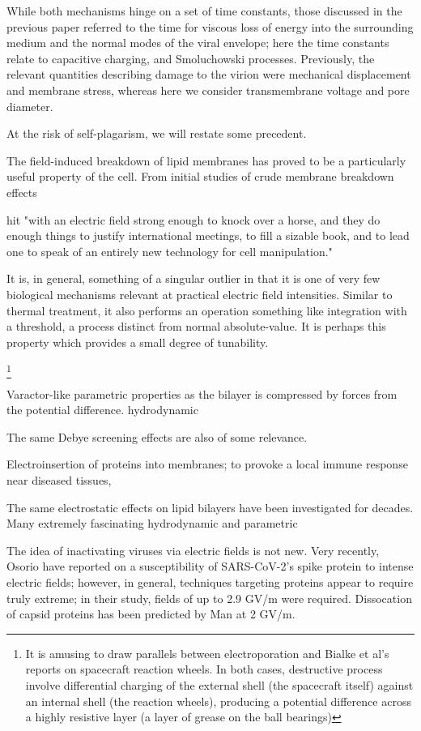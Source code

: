 \documentclass[fleqn,10pt]{paper}
\begin{document}
While both mechanisms hinge on a set of time constants, those discussed in the previous paper referred to the time for viscous loss of energy into the surrounding medium and the normal modes of the viral envelope; here the time constants relate to capacitive charging, and Smoluchowski processes. Previously, the relevant quantities describing damage to the virion were mechanical displacement and membrane stress, whereas here we consider transmembrane voltage and pore diameter. 

At the risk of self-plagarism, we will restate some precedent.

The field-induced breakdown of lipid membranes has proved to be a particularly useful property of the cell. From initial studies of crude membrane breakdown effects \cite{Reversible1979}

hit "with an electric field strong enough to knock over a horse, and they do enough things to justify international meetings, to fill a sizable book, and to lead one to speak of an entirely new technology for cell manipulation."

It is, in general, something of a singular outlier in that it is one of very few biological mechanisms relevant at practical electric field intensities. Similar to thermal treatment, it also performs an operation something like integration with a threshold, a process distinct from normal absolute-value. It is perhaps this property which provides a small degree of tunability.

\footnote{It is amusing to draw parallels between electroporation and Bialke et al's reports on spacecraft reaction wheels. In both cases, destructive process involve differential charging of the external shell (the spacecraft itself) against an internal shell (the reaction wheels), producing a potential difference across a highly resistive layer (a layer of grease on the ball bearings)}


Varactor-like parametric properties as the bilayer is compressed by forces from the potential difference. hydrodynamic

The same Debye screening effects are also of some relevance. 

Electroinsertion of proteins into membranes\cite{Clinical1996}; to provoke a local immune response near diseased tissues, 

The same electrostatic effects on lipid bilayers have been investigated for decades. Many extremely fascinating hydrodynamic and parametric 

The idea of inactivating viruses via electric fields is not new. Very recently, Osorio \cite{Receptor2021} have reported on a susceptibility of SARS-CoV-2's spike protein to intense electric fields; however, in general, techniques targeting proteins appear to require truly extreme; in their study, fields of up to 2.9 GV/m were required. Dissocation of capsid proteins has been predicted by Man \cite{Picosecond2016b} at 2 GV/m.
\end{document}
